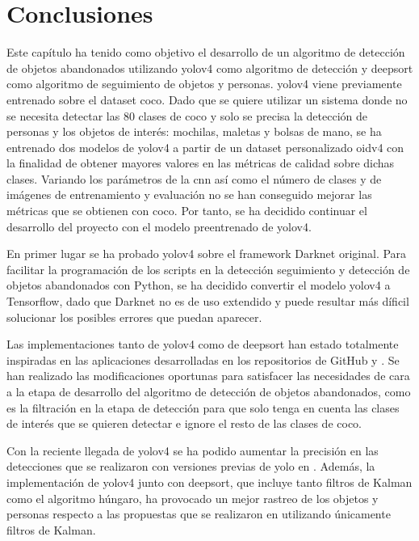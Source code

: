 \section{Conclusiones}
\label{sec:conclu-desarrollo}

Este capítulo ha tenido como objetivo el desarrollo de un algoritmo de detección de objetos abandonados utilizando \gls{yolov4} como algoritmo de detección y \gls{deepsort} como algoritmo de seguimiento de objetos y personas. \gls{yolov4} viene previamente entrenado sobre el dataset \gls{coco}. Dado que se quiere utilizar un sistema donde no se necesita detectar las 80 clases de \gls{coco} y solo se precisa la detección de personas y los objetos de interés: mochilas, maletas y bolsas de mano, se ha entrenado dos modelos de \gls{yolov4} a partir de un dataset personalizado \gls{oidv4} con la finalidad de obtener mayores valores en las métricas de calidad sobre dichas clases. Variando los parámetros de la \gls{cnn} así como el número de clases y de imágenes de entrenamiento y evaluación no se han conseguido mejorar las métricas que se obtienen con \gls{coco}. Por tanto, se ha decidido continuar el desarrollo del proyecto con el modelo preentrenado de \gls{yolov4}.

En primer lugar se ha probado \gls{yolov4} sobre el framework Darknet original. Para facilitar la programación de los scripts en la detección seguimiento y detección de objetos abandonados con Python, se ha decidido convertir el modelo \gls{yolov4} a Tensorflow, dado que Darknet no es de uso extendido y puede resultar más díficil solucionar los posibles errores que puedan aparecer.

Las implementaciones tanto de \gls{yolov4} como de \gls{deepsort} han estado totalmente inspiradas en las aplicaciones desarrolladas en los repositorios de GitHub \cite{yolov4-tf-github-original} y \cite{yolov4-deepsort-original}. Se han realizado las modificaciones oportunas para satisfacer las necesidades de cara a la etapa de desarrollo del algoritmo de detección de objetos abandonados, como es la filtración en la etapa de detección para que solo tenga en cuenta las clases de interés que se quieren detectar e ignore el resto de las clases de \gls{coco}.

Con la reciente llegada de \gls{yolov4} se ha podido aumentar la precisión en las detecciones que se realizaron con versiones previas de \gls{yolo} en \cite{valdivieso2018}. Además, la implementación de \gls{yolov4} junto con \gls{deepsort}, que incluye tanto filtros de Kalman como el algoritmo húngaro, ha provocado un mejor rastreo de los objetos y personas respecto a las propuestas que se realizaron en \cite{valdivieso2018} utilizando únicamente filtros de Kalman.

